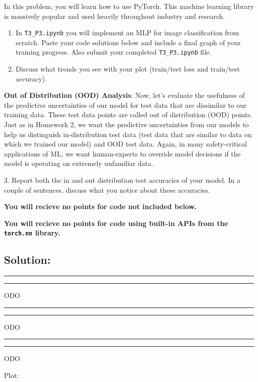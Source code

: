 \documentclass[submit]{harvardml}
\newcommand{\question}[2] {\vspace{.25in} \hrule\vspace{0.5em}
\noindent{\bf #1: #2} \vspace{0.5em}
\hrule \vspace{.10in}}
\begin{document}
\begin{problem}

In this problem, you will learn how to use PyTorch. This machine learning library is massively popular and used heavily throughout industry and research. 


\begin{enumerate}
    \item In \verb|T3_P3.ipynb| you will implement an MLP for image classification from scratch. Paste your code solutions below and include a final graph of your training progress. Also submit your completed \verb|T3_P3.ipynb| file.
    \item Discuss what trends you see with your plot (train/test loss and train/test accuracy).
\end{enumerate}

\textbf{Out of Distribution (OOD) Analysis}: Now, let's evaluate the usefulness of the predictive uncertainties of our model for test data that are dissimilar to our training data. These test data points are called out of distribution (OOD) points. Just as in Homework 2, we want the predictive uncertainties from our models to help us distinguish in-distribution test data (test data that are similar to data on which we trained our model) and OOD test data. Again, in many safety-critical applications of ML, we want human-experts to override model decisions if the model is operating on extremely unfamiliar data. 

\hspace{3mm} 3. Report both the in and out distribution test accuracies of your model. In a couple of sentences, discuss what you notice about these accuracies.

  {\bfseries You will recieve no points for code not included below.}

  {\bfseries You will recieve no points for code using built-in APIs from the \verb|torch.nn| library.}
  
\end{problem}


\subsection*{Solution:}


\question{3.1} 
TODO

\question{3.2} 
TODO

\question{3.3} 
TODO

Plot:
\end{document}
